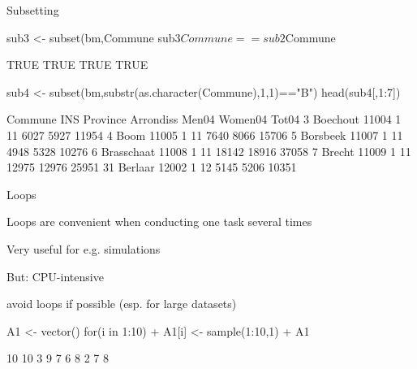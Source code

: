 \documentclass[11pt,german,hideothersubsections]{beamer}
\begin{document}
\begin{frame}[fragile]{Subsetting}
\footnotesize{
\begin{Schunk}
\begin{Sinput}
 sub3 <- subset(bm,Commune %
 sub3$Commune == sub2$Commune
\end{Sinput}
\begin{Soutput}
[1] TRUE TRUE TRUE TRUE
\end{Soutput}
\end{Schunk}


\begin{Schunk}
\begin{Sinput}
 sub4 <- subset(bm,substr(as.character(Commune),1,1)=="B")
 head(sub4[,1:7])
\end{Sinput}
\begin{Soutput}
      Commune   INS Province Arrondiss Men04 Women04 Tot04
3    Boechout 11004        1        11  6027    5927 11954
4        Boom 11005        1        11  7640    8066 15706
5    Borsbeek 11007        1        11  4948    5328 10276
6  Brasschaat 11008        1        11 18142   18916 37058
7      Brecht 11009        1        11 12975   12976 25951
31    Berlaar 12002        1        12  5145    5206 10351
\end{Soutput}
\end{Schunk}
}
\end{frame}
\begin{frame}[fragile]{Loops}

\begin{itemize}
\footnotesize{
\item Loops are convenient when conducting one task several times
\pause\item Very useful for e.g. simulations
\pause\item But: CPU-intensive
\pause\item[$\Rightarrow$] avoid loops if possible (esp. for large datasets)}
\end{itemize}
\pause\footnotesize{
\begin{Schunk}
\begin{Sinput}
 A1 <- vector()
 for(i in 1:10){
+   A1[i] <- sample(1:10,1)
+ }
 A1
\end{Sinput}
\begin{Soutput}
 [1] 10 10  3  9  7  6  8  2  7  8
\end{Soutput}
\end{Schunk}
}
\end{frame}
\end{document}
